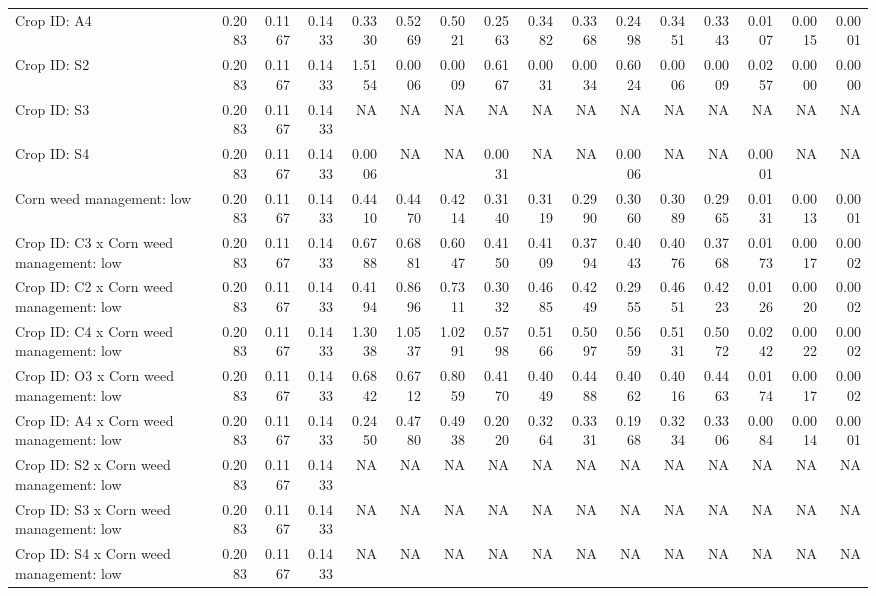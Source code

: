 \documentclass[
]{article}
\begin{document}
\begin{landscape}
\begin{table}
{\begin{tabular}[t]{lrr>{}rrr>{}rrr>{}rrr>{}rrr>{}r}
Crop ID: A4 & 0.2083 & 0.1167 & 0.1433 & 0.3330 & 0.5269 & 0.5021 & 0.2563 & 0.3482 & 0.3368 & 0.2498 & 0.3451 & 0.3343 & 0.0107 & 0.0015 & 0.0001\\
Crop ID: S2 & 0.2083 & 0.1167 & 0.1433 & 1.5154 & 0.0006 & 0.0009 & 0.6167 & 0.0031 & 0.0034 & 0.6024 & 0.0006 & 0.0009 & 0.0257 & 0.0000 & 0.0000\\
Crop ID: S3 & 0.2083 & 0.1167 & 0.1433 & NA & NA & NA & NA & NA & NA & NA & NA & NA & NA & NA & NA\\
Crop ID: S4 & 0.2083 & 0.1167 & 0.1433 & 0.0006 & NA & NA & 0.0031 & NA & NA & 0.0006 & NA & NA & 0.0001 & NA & NA\\
Corn weed management: low & 0.2083 & 0.1167 & 0.1433 & 0.4410 & 0.4470 & 0.4214 & 0.3140 & 0.3119 & 0.2990 & 0.3060 & 0.3089 & 0.2965 & 0.0131 & 0.0013 & 0.0001\\
Crop ID: C3 x Corn weed management: low & 0.2083 & 0.1167 & 0.1433 & 0.6788 & 0.6881 & 0.6047 & 0.4150 & 0.4109 & 0.3794 & 0.4043 & 0.4076 & 0.3768 & 0.0173 & 0.0017 & 0.0002\\
Crop ID: C2 x Corn weed management: low & 0.2083 & 0.1167 & 0.1433 & 0.4194 & 0.8696 & 0.7311 & 0.3032 & 0.4685 & 0.4249 & 0.2955 & 0.4651 & 0.4223 & 0.0126 & 0.0020 & 0.0002\\
Crop ID: C4 x Corn weed management: low & 0.2083 & 0.1167 & 0.1433 & 1.3038 & 1.0537 & 1.0291 & 0.5798 & 0.5166 & 0.5097 & 0.5659 & 0.5131 & 0.5072 & 0.0242 & 0.0022 & 0.0002\\
Crop ID: O3 x Corn weed management: low & 0.2083 & 0.1167 & 0.1433 & 0.6842 & 0.6712 & 0.8059 & 0.4170 & 0.4049 & 0.4488 & 0.4062 & 0.4016 & 0.4463 & 0.0174 & 0.0017 & 0.0002\\
Crop ID: A4 x Corn weed management: low & 0.2083 & 0.1167 & 0.1433 & 0.2450 & 0.4780 & 0.4938 & 0.2020 & 0.3264 & 0.3331 & 0.1968 & 0.3234 & 0.3306 & 0.0084 & 0.0014 & 0.0001\\
Crop ID: S2 x Corn weed management: low & 0.2083 & 0.1167 & 0.1433 & NA & NA & NA & NA & NA & NA & NA & NA & NA & NA & NA & NA\\
Crop ID: S3 x Corn weed management: low & 0.2083 & 0.1167 & 0.1433 & NA & NA & NA & NA & NA & NA & NA & NA & NA & NA & NA & NA\\
Crop ID: S4 x Corn weed management: low & 0.2083 & 0.1167 & 0.1433 & NA & NA & NA & NA & NA & NA & NA & NA & NA & NA & NA & NA\\
\bottomrule
\end{tabular}}
\end{table}
\end{landscape}
\end{document}

